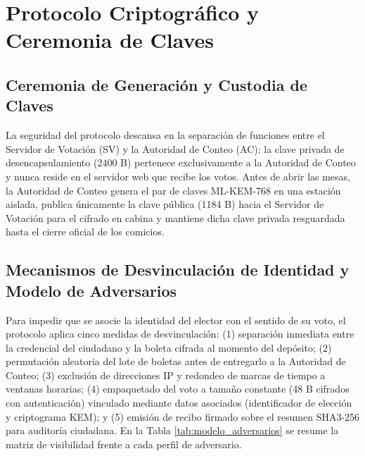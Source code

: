 \section{Protocolo Criptográfico y Ceremonia de Claves}
\label{sec:ceremonia_identidad_adversarios}

\subsection{Ceremonia de Generación y Custodia de Claves}

La seguridad del protocolo descansa en la separación de funciones entre el Servidor de Votación (SV) y la Autoridad de Conteo (AC): la clave privada de desencapsulamiento (2400 B) pertenece exclusivamente a la Autoridad de Conteo y nunca reside en el servidor web que recibe los votos. Antes de abrir las mesas, la Autoridad de Conteo genera el par de claves ML-KEM-768 en una estación aislada, publica únicamente la clave pública (1184 B) hacia el Servidor de Votación para el cifrado en cabina y mantiene dicha clave privada resguardada hasta el cierre oficial de los comicios.

\subsection{Mecanismos de Desvinculación de Identidad y Modelo de Adversarios}

Para impedir que se asocie la identidad del elector con el sentido de su voto, el protocolo aplica cinco medidas de desvinculación: (1) separación inmediata entre la credencial del ciudadano y la boleta cifrada al momento del depósito; (2) permutación aleatoria del lote de boletas antes de entregarlo a la Autoridad de Conteo; (3) exclusión de direcciones IP y redondeo de marcas de tiempo a ventanas horarias; (4) empaquetado del voto a tamaño constante (48 B cifrados con autenticación) vinculado mediante datos asociados (identificador de elección y criptograma KEM); y (5) emisión de recibo firmado sobre el resumen SHA3-256 para auditoría ciudadana. En la Tabla \ref{tab:modelo_adversarios} se resume la matriz de visibilidad frente a cada perfil de adversario.

